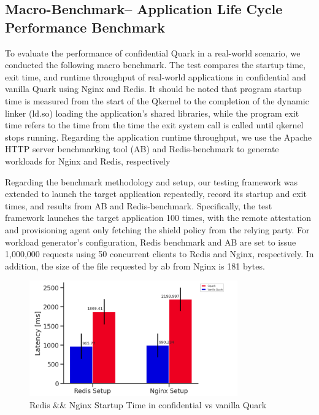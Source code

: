 \subsection{Macro-Benchmark– Application Life Cycle Performance Benchmark}\label{macri_app_start_up}

To evaluate the performance of confidential Quark in a real-world scenario, we conducted the following macro benchmark. The test compares the startup time, exit time, and runtime throughput of real-world applications in confidential and vanilla Quark using Nginx\cite*{nginx} and Redis\cite*{redis}. It should be noted that 
program startup time is measured from the start of the Qkernel to the completion of the dynamic linker (ld.so) loading the application's shared libraries, while the program exit time refers to the time from the time the exit system call is called until qkernel stops running. 
Regarding the application runtime throughput, we use the Apache HTTP server benchmarking tool (AB)\cite*{ab} and Redis-benchmark\cite*{Redis_benchmark} to generate workloads for Nginx and Redis, respectively


Regarding the benchmark methodology and setup, our testing framework\cite*{benchamark_framework} was extended to launch the target application repeatedly, record its startup and exit times, and results from AB\cite*{ab} and Redis-benchmark\cite*{Redis_benchmark}. Specifically, the test framework launches the 
target application 100 times, with the remote attestation and provisioning agent only fetching the shield policy from the relying party. For workload generator’s configuration, Redis benchmark\cite*{Redis_benchmark} and AB\cite*{ab} are set to issue 1,000,000 requests using 50 concurrent clients to Redis and Nginx, respectively. 
In addition, the size of the file requested by ab from Nginx\cite*{nginx} is 181 bytes.

\begin{figure}[H]
    \centering
    \includegraphics[width=0.8\textwidth]{images/reds_nginx_startup_comp.PNG}
    \caption[Redis \&\& Nginx Startup Time in Cquark vs vanilla Quark]{Redis \&\& Nginx Startup Time in confidential vs vanilla Quark}
    \label{fig:reds_nginx_startup_comp}
\end{figure}

